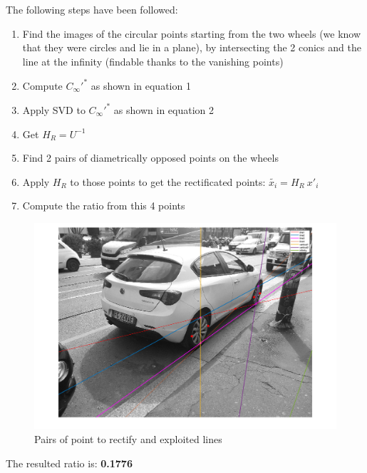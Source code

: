 \documentclass{article}
\begin{document}
\vspace{6mm}
The following steps have been followed:
\begin{enumerate}
    \item Find the images of the circular points starting from the two wheels (we know that they were circles and lie in a plane), by intersecting the 2 conics and the line at the infinity (findable thanks to the vanishing points)
    \item Compute $ C_\infty'^* $ as shown in equation 1
    \item Apply SVD to $ C_\infty'^* $ as shown in equation 2
    \item Get $ H_R = U^{-1} $
    \item Find 2 pairs of diametrically opposed points on the wheels
    \item Apply $ H_R $ to those points to get the rectificated points:
          $ \tilde{x_i} = H_R \: x'_i $
    \item Compute the ratio from this 4 points
\end{enumerate}

\begin{figure}[h!]
\centering
\includegraphics[scale=0.35]{images/homework_10.png}
\caption{Pairs of point to rectify and exploited lines}
\label{fig:rectification}
\end{figure}

The resulted ratio is: \textbf{0.1776}

\newpage
\end{document}

